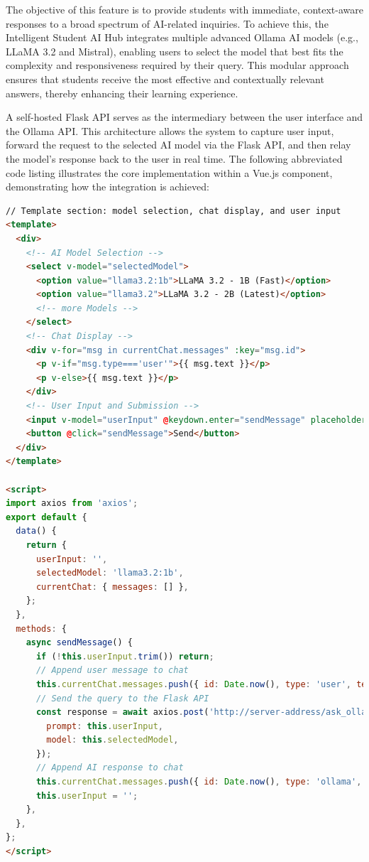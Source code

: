 The objective of this feature is to provide students with immediate, context-aware responses to a broad spectrum of AI-related inquiries. To achieve this, the Intelligent Student AI Hub integrates multiple advanced Ollama AI models (e.g., LLaMA 3.2 and Mistral), enabling users to select the model that best fits the complexity and responsiveness required by their query. This modular approach ensures that students receive the most effective and contextually relevant answers, thereby enhancing their learning experience.

A self-hosted Flask API serves as the intermediary between the user interface and the Ollama API. This architecture allows the system to capture user input, forward the request to the selected AI model via the Flask API, and then relay the model's response back to the user in real time. The following abbreviated code listing illustrates the core implementation within a Vue.js component, demonstrating how the integration is achieved:

\begin{lstlisting}[language=html, caption={Abbreviated Vue.js Integration Example}, frame=single]
// Template section: model selection, chat display, and user input
<template>
  <div>
    <!-- AI Model Selection -->
    <select v-model="selectedModel">
      <option value="llama3.2:1b">LLaMA 3.2 - 1B (Fast)</option>
      <option value="llama3.2">LLaMA 3.2 - 2B (Latest)</option>
      <!-- more Models -->
    </select>
    <!-- Chat Display -->
    <div v-for="msg in currentChat.messages" :key="msg.id">
      <p v-if="msg.type==='user'">{{ msg.text }}</p>
      <p v-else>{{ msg.text }}</p>
    </div>
    <!-- User Input and Submission -->
    <input v-model="userInput" @keydown.enter="sendMessage" placeholder="Ask the AI question..." />
    <button @click="sendMessage">Send</button>
  </div>
</template>

<script>
import axios from 'axios';
export default {
  data() {
    return {
      userInput: '',
      selectedModel: 'llama3.2:1b',
      currentChat: { messages: [] },
    };
  },
  methods: {
    async sendMessage() {
      if (!this.userInput.trim()) return;
      // Append user message to chat
      this.currentChat.messages.push({ id: Date.now(), type: 'user', text: this.userInput });
      // Send the query to the Flask API
      const response = await axios.post('http://server-address/ask_ollama', {
        prompt: this.userInput,
        model: this.selectedModel,
      });
      // Append AI response to chat
      this.currentChat.messages.push({ id: Date.now(), type: 'ollama', text: response.data.choices[0].text });
      this.userInput = '';
    },
  },
};
</script>
\end{lstlisting}

